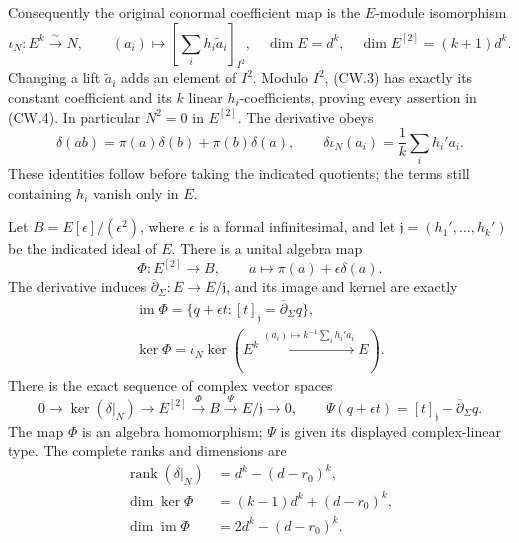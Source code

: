 Consequently the original conormal coefficient map is the
\(E\)-module isomorphism
\[
 \iota_N:E^k\xrightarrow{\sim}N,\qquad
 (a_i)\longmapsto\left[\sum_i h_i\widetilde a_i\right]_{I^2},
 \quad
 \dim E=d^k,\quad \dim E^{[2]}=(k+1)d^k .
 \tag{CW.4}
\]
Changing a lift \(\widetilde a_i\) adds an element of \(I^2\).
Modulo \(I^2\), (CW.3) has exactly its constant coefficient and
its \(k\) linear \(h_i\)-coefficients, proving every assertion
in (CW.4).  In particular \(N^2=0\) in \(E^{[2]}\).
The derivative obeys
\[
 \delta(ab)=\pi(a)\delta(b)+\pi(b)\delta(a),\qquad
 \delta\iota_N(a_i)=\frac1k\sum_i h_i'a_i .
 \tag{CW.5}
\]
These identities follow before taking the indicated quotients;
the terms still containing \(h_i\) vanish only in \(E\).

\begin{theorem}
Let \(B=E[\epsilon]/(\epsilon^2)\), where \(\epsilon\) is a
formal infinitesimal, and let \(\mathfrak j=(h_1',\ldots,h_k')\)
be the indicated ideal of \(E\).  There is a unital algebra map
\[
 \Phi:E^{[2]}\to B,\qquad
 a\longmapsto\pi(a)+\epsilon\delta(a).
 \tag{CW.6}
\]
The derivative induces
\(\overline\partial_\Sigma:E\to E/\mathfrak j\), and its image
and kernel are exactly
\[
 \begin{gathered}
 \operatorname{im}\Phi
   =\{q+\epsilon t:[t]_{\mathfrak j}
                         =\overline\partial_\Sigma q\},\\
 \ker\Phi=\iota_N\ker\left(E^k\xrightarrow{(a_i)\mapsto
                               k^{-1}\sum_i h_i'a_i}E\right).
 \end{gathered}                                                    \tag{CW.7}
\]
There is the exact sequence of complex vector spaces
\[
 0\longrightarrow\ker(\delta|_N)\longrightarrow E^{[2]}
 \xrightarrow{\Phi} B
 \xrightarrow{\Psi}E/\mathfrak j\longrightarrow0,\qquad
 \Psi(q+\epsilon t)=[t]_{\mathfrak j}
                              -\overline\partial_\Sigma q .
 \tag{CW.8}
\]
The map \(\Phi\) is an algebra homomorphism; \(\Psi\) is given
its displayed complex-linear type.
The complete ranks and dimensions are
\[
 \begin{aligned}
 \operatorname{rank}(\delta|_N)&=d^k-(d-r_0)^k,\\
 \dim\ker\Phi&=(k-1)d^k+(d-r_0)^k,\\
 \dim\operatorname{im}\Phi&=2d^k-(d-r_0)^k.
 \end{aligned}                                                    \tag{CW.9}
\]
\end{theorem}

